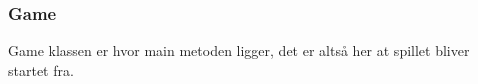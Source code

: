 \subsubsection{Game}
Game klassen er hvor main metoden ligger, det er altså her at spillet bliver startet fra. 


